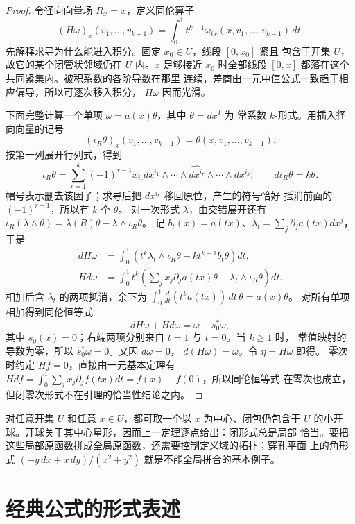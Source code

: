 \begin{proof}
令径向向量场 $R_x=x$，定义同伦算子
\[
 (H\omega)_x(v_1,\ldots,v_{k-1})
 =\int_0^1t^{k-1}\omega_{tx}(x,v_1,\ldots,v_{k-1})\,dt.
\]
先解释求导为什么能进入积分。固定 $x_0\in U$，线段 $[0,x_0]$ 紧且
包含于开集 $U$，故它的某个闭管状邻域仍在 $U$ 内。$x$ 足够接近 $x_0$
时全部线段 $[0,x]$ 都落在这个共同紧集内。被积系数的各阶导数在那里
连续，差商由一元中值公式一致趋于相应偏导，所以可逐次移入积分，
$H\omega$ 因而光滑。

下面完整计算一个单项 $\omega=a(x)\theta$，其中 $\theta=dx^I$ 为
常系数 $k$-形式。用插入径向向量的记号
\[
 (\iota_R\theta)_x(v_1,\ldots,v_{k-1})=\theta(x,v_1,\ldots,v_{k-1}).
\]
按第一列展开行列式，得到
\[
 \iota_R\theta=\sum_{r=1}^k(-1)^{r-1}x_{i_r}
 dx^{i_1}\wedge\cdots\wedge\widehat{dx^{i_r}}\wedge\cdots\wedge dx^{i_k},
 \qquad d\iota_R\theta=k\theta.
\]
帽号表示删去该因子；求导后把 $dx^{i_r}$ 移回原位，产生的符号恰好
抵消前面的 $(-1)^{r-1}$，所以有 $k$ 个 $\theta$。
对一次形式 $\lambda$，由交错展开还有
$\iota_R(\lambda\wedge\theta)=\lambda(R)\theta-\lambda\wedge\iota_R\theta$。
记 $b_t(x)=a(tx)$、$\lambda_t=\sum_j\partial_j a(tx)dx^j$，于是
\begin{align*}
 dH\omega&=\int_0^1\left(t^k\lambda_t\wedge\iota_R\theta
                       +k t^{k-1}b_t\theta\right)dt,\\
 Hd\omega&=\int_0^1t^k\left(\sum_jx_j\partial_ja(tx)\theta
                       -\lambda_t\wedge\iota_R\theta\right)dt.
\end{align*}
相加后含 $\lambda_t$ 的两项抵消，余下为
$\int_0^1\frac{d}{dt}(t^ka(tx))\,dt\,\theta= a(x)\theta$。
对所有单项相加得到同伦恒等式
\[
 dH\omega+Hd\omega=\omega-s_0^*\omega,
\]
其中 $s_0(x)=0$；右端两项分别来自 $t=1$ 与 $t=0$。当 $k\ge1$ 时，
常值映射的导数为零，所以 $s_0^*\omega=0$。又因 $d\omega=0$，
$d(H\omega)=\omega$。令 $\eta=H\omega$ 即得。
零次时约定 $Hf=0$，直接由一元基本定理有
$Hdf=\int_0^1\sum_jx_j\partial_jf(tx)dt=f(x)-f(0)$，所以同伦恒等式
在零次也成立，但闭零次形式不在引理的恰当性结论之内。
\end{proof}

对任意开集 $U$ 和任意 $x\in U$，都可取一个以 $x$ 为中心、闭包仍包含于
$U$ 的小开球。开球关于其中心星形，因而上一定理逐点给出：闭形式总是局部
恰当。要把这些局部原函数拼成全局原函数，还需要控制定义域的拓扑；穿孔平面
上的角形式 $(-y\,dx+x\,dy)/(x^2+y^2)$ 就是不能全局拼合的基本例子。

\section{经典公式的形式表述}

